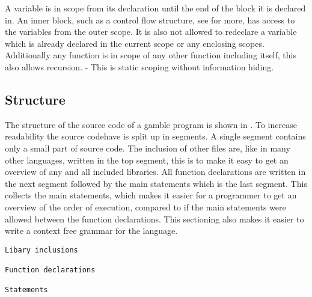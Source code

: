 A variable is in scope from its declaration until the end of the block it is declared in.
An inner block, such as a control flow structure, see  for more, has access to the variables from the outer scope. 
It is also not allowed to redeclare a variable which is already declared in the current scope or any enclosing scopes. 
Additionally any function is in scope of any other function including itself, this also allows recursion. 
- This is static scoping without information hiding. 

\subsection*{Structure}\label{subsec:Struc}
The structure of the source code of a \gls{gamble} program is shown in .
To increase readability the source codehave is split up in segments.
A single segment contains only a small part of source code.
The inclusion of other files are, like in many other languages, written in the top segment, this is to make it easy to get an overview of any and all included libraries. 
All function declarations are written in the next segment followed by the main statements which is the last segment.
This collects the main statements, which makes it easier for a programmer to get an overview of the order of execution, compared to if the main statements were allowed between the function declarations.
This sectioning also makes it easier to write a context free grammar for the language. 

\begin{lstlisting}[caption={Source code file layout in \gls{gamble}},frame=tlrb,label={lst:Structure}, numbers=none]
Libary inclusions

Function declarations

Statements
\end{lstlisting}                           